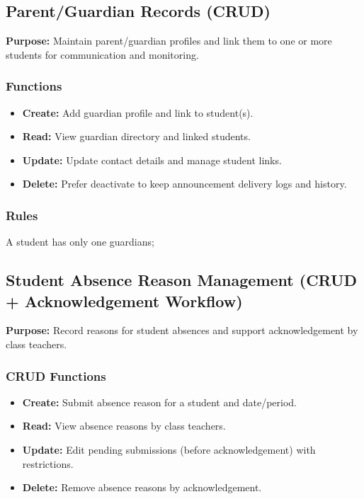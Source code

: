 \documentclass[12pt,a4paper]{article}
\begin{document}
\subsection{Parent/Guardian Records (CRUD)}
\textbf{Purpose:} Maintain parent/guardian profiles and link them to one or more students for communication and monitoring.

\subsubsection*{Functions}
\begin{itemize}[leftmargin=*]
  \item \textbf{Create:} Add guardian profile and link to student(s).
  \item \textbf{Read:} View guardian directory and linked students.
  \item \textbf{Update:} Update contact details and manage student links.
  \item \textbf{Delete:} Prefer deactivate to keep announcement delivery logs and history.
\end{itemize}

\subsubsection*{Rules}
A student has only one guardians;

\subsection{Student Absence Reason Management (CRUD + Acknowledgement Workflow)}
\textbf{Purpose:} Record reasons for student absences and support acknowledgement by class teachers.

\subsubsection*{CRUD Functions}
\begin{itemize}[leftmargin=*]
  \item \textbf{Create:} Submit absence reason for a student and date/period.
  \item \textbf{Read:} View absence reasons by class teachers.
  \item \textbf{Update:} Edit pending submissions (before acknowledgement) with restrictions.
  \item \textbf{Delete:} Remove absence reasons by acknowledgement.
\end{itemize}
\end{document}
